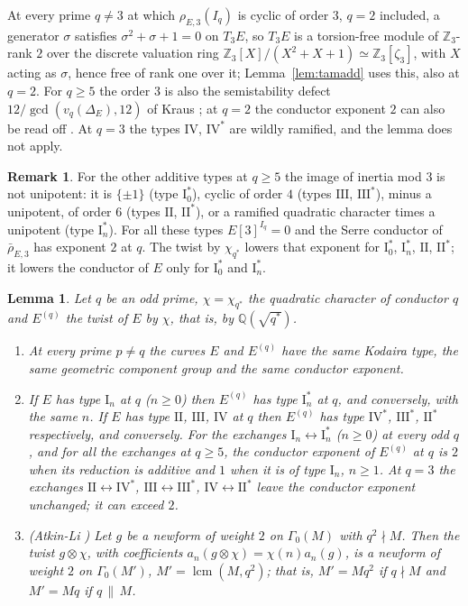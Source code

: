 \documentclass[11pt]{amsart}
\newtheorem{lemma}[theorem]{Lemma}
\theoremstyle{definition}
\newtheorem{remark}[theorem]{Remark}
\newcommand{\Q}{\mathbb{Q}}
\newcommand{\Z}{\mathbb{Z}}
\begin{document}
At every prime $q\ne3$ at which $\rho_{E,3}(I_q)$ is cyclic of order $3$, $q=2$ included, a generator $\sigma$ satisfies $\sigma^2+\sigma+1=0$ on $T_3E$, so $T_3E$ is a torsion-free module of $\Z_3$-rank $2$ over the discrete valuation ring $\Z_3[X]/(X^2+X+1)\simeq\Z_3[\zeta_3]$, with $X$ acting as $\sigma$, hence free of rank one over it; Lemma~\ref{lem:tamadd} uses this, also at $q=2$. For $q\ge5$ the order $3$ is also the semistability defect $12/\gcd(v_q(\Delta_E),12)$ of Kraus \cite{Kraus90}; at $q=2$ the conductor exponent $2$ can also be read off \cite{DokDok15}. At $q=3$ the types $\mathrm{IV}$, $\mathrm{IV}^*$ are wildly ramified, and the lemma does not apply.

\begin{remark}\label{rem:types}
For the other additive types at $q\ge5$ the image of inertia mod $3$ is not unipotent: it is $\{\pm1\}$ (type $\mathrm{I}_0^*$), cyclic of order $4$ (types $\mathrm{III}$, $\mathrm{III}^*$), minus a unipotent, of order $6$ (types $\mathrm{II}$, $\mathrm{II}^*$), or a ramified quadratic character times a unipotent (type $\mathrm{I}_n^*$). For all these types $E[3]^{I_q}=0$ and the Serre conductor of $\bar\rho_{E,3}$ has exponent $2$ at $q$. The twist by $\chi_{q^*}$ lowers that exponent for $\mathrm{I}_0^*$, $\mathrm{I}_n^*$, $\mathrm{II}$, $\mathrm{II}^*$; it lowers the conductor of $E$ only for $\mathrm{I}_0^*$ and $\mathrm{I}_n^*$.
\end{remark}

\begin{lemma}\label{lem:twist}
Let $q$ be an odd prime, $\chi=\chi_{q^*}$ the quadratic character of conductor $q$ and $E^{(q)}$ the twist of $E$ by $\chi$, that is, by $\Q(\sqrt{q^*})$.
\begin{enumerate}
\item[(i)] At every prime $p\ne q$ the curves $E$ and $E^{(q)}$ have the same Kodaira type, the same geometric component group and the same conductor exponent.
\item[(ii)] If $E$ has type $\mathrm{I}_n$ at $q$ ($n\ge0$) then $E^{(q)}$ has type $\mathrm{I}_n^*$ at $q$, and conversely, with the same $n$. If $E$ has type $\mathrm{II}$, $\mathrm{III}$, $\mathrm{IV}$ at $q$ then $E^{(q)}$ has type $\mathrm{IV}^*$, $\mathrm{III}^*$, $\mathrm{II}^*$ respectively, and conversely. For the exchanges $\mathrm{I}_n\leftrightarrow\mathrm{I}_n^*$ ($n\ge0$) at every odd $q$, and for all the exchanges at $q\ge5$, the conductor exponent of $E^{(q)}$ at $q$ is $2$ when its reduction is additive and $1$ when it is of type $\mathrm{I}_n$, $n\ge1$. At $q=3$ the exchanges $\mathrm{II}\leftrightarrow\mathrm{IV}^*$, $\mathrm{III}\leftrightarrow\mathrm{III}^*$, $\mathrm{IV}\leftrightarrow\mathrm{II}^*$ leave the conductor exponent unchanged; it can exceed $2$.
\item[(iii)] (Atkin-Li \cite{AtkinLi78}) Let $g$ be a newform of weight $2$ on $\Gamma_0(M)$ with $q^2\nmid M$. Then the twist $g\otimes\chi$, with coefficients $a_n(g\otimes\chi)=\chi(n)a_n(g)$, is a newform of weight $2$ on $\Gamma_0(M')$, $M'=\operatorname{lcm}(M,q^2)$; that is, $M'=Mq^2$ if $q\nmid M$ and $M'=Mq$ if $q\,\|\,M$.
\end{enumerate}
\end{lemma}
\end{document}
